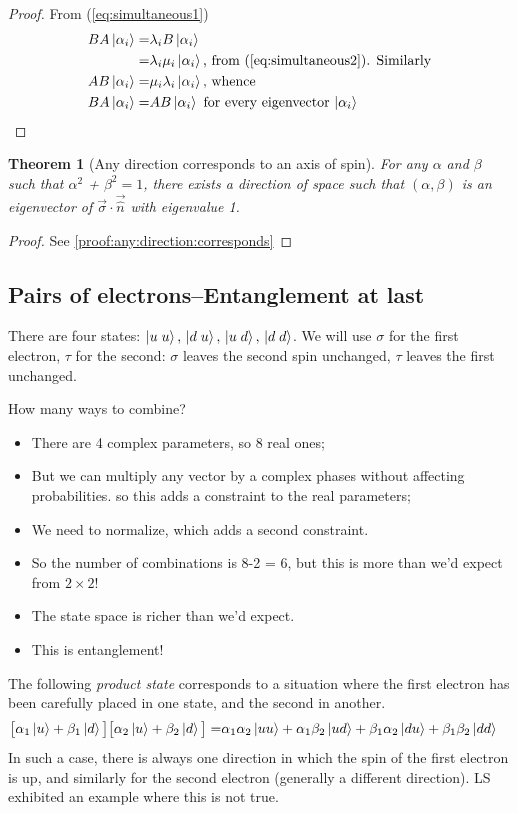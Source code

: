 \documentclass[]{article}
\newtheorem{thm}{Theorem}
\begin{document}
\begin{proof}
	From (\ref{eq:simultaneous1})
	\begin{align*}
		B A\ket{\alpha_i} =& \lambda_i B \ket{\alpha_i}\\
		=& \lambda_i \mu_i \ket{\alpha_i} \text{, from (\ref{eq:simultaneous2})} \text{. Similarly}\\
		A  B \ket{\alpha_i} =& \mu_i  \lambda_i \ket{\alpha_i} \text{, whence}\\
		B A\ket{\alpha_i} =& A  B \ket{\alpha_i} \text{ for every eigenvector $\ket{\alpha_i}$}
	\end{align*}
\end{proof}
\begin{thm}[Any direction corresponds to an axis of spin]\label{thm:any:direction:corresponds}
	For any $\alpha$ and $\beta$ such that $\alpha^2$ + $\beta^2=1$, there exists a direction of space such that $(\alpha, \beta)$ is an eigenvector of $\vec{\sigma} \cdot\vec{\hat{n}}$ with eigenvalue 1.
\end{thm}
\begin{proof}
	See \ref{proof:any:direction:corresponds}
\end{proof}
\subsection{Pairs of electrons--Entanglement at last}
There are four states: $\ket{u\;u}, \,\ket{d\;u}, \,\ket{u\;d}, \,\ket{d\;d}$.  We will use $\sigma$ for the first electron, $\tau$ for the second:  $\sigma$ leaves the second spin unchanged, $\tau$ leaves the first unchanged.

How many ways to combine? 
\begin{itemize}
	\item There are 4 complex parameters, so 8 real ones;
	\item But we can multiply any vector by a complex phases without affecting probabilities. so this adds a constraint to the real parameters;
	\item We need to normalize, which adds a second constraint.
	\item So the number of combinations is 8-2 = 6, but this is more than we'd expect from $2\times2$!
	\item The state space is richer than we'd expect. 
	\item This is entanglement!
\end{itemize}


The following \emph{product state} corresponds to a situation where the first electron has been carefully placed in one state, and the second in another.
\begin{align*}
	\big[\alpha_1\ket{u} + \beta_1\ket{d}\big]\big[\alpha_2\ket{u} + \beta_2\ket{d}\big] =& \alpha_1 \alpha_2 \ket{uu} + \alpha_1 \beta_2 \ket{ud} + \beta_1 \alpha_2 \ket{du} + \beta_1 \beta_2 \ket{dd}
\end{align*}
In such a case, there is always one direction in which the spin of the first electron is up, and similarly for the second electron (generally a different direction). LS exhibited an example where this is not true.
\end{document}

